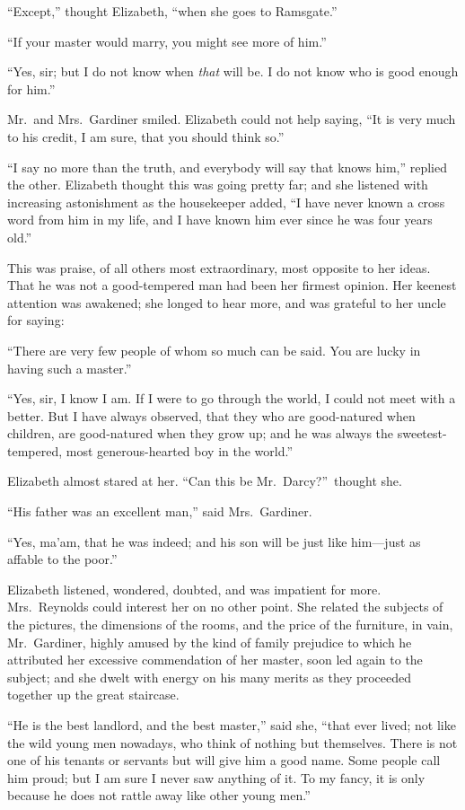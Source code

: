 \documentclass[12pt,english,oneside]{book}
\begin{document}
{}``Except,'' thought Elizabeth, {}``when she goes to Ramsgate.''

{}``If your master would marry, you might see more of him.''

{}``Yes, sir; but I do not know when \textit{that} will be. I do
not know who is good enough for him.''

Mr.\ and Mrs.\ Gardiner smiled. Elizabeth could not help saying,
{}``It is very much to his credit, I am sure, that you should think
so.''

{}``I say no more than the truth, and everybody will say that knows
him,'' replied the other. Elizabeth thought this was going pretty
far; and she listened with increasing astonishment as the housekeeper
added, {}``I have never known a cross word from him in my life, and
I have known him ever since he was four years old.''

This was praise, of all others most extraordinary, most opposite to
her ideas. That he was not a good-tempered man had been her firmest
opinion. Her keenest attention was awakened; she longed to hear more,
and was grateful to her uncle for saying:

{}``There are very few people of whom so much can be said. You are
lucky in having such a master.''

{}``Yes, sir, I know I am. If I were to go through the world, I could
not meet with a better. But I have always observed, that they who
are good-natured when children, are good-natured when they grow up;
and he was always the sweetest-tempered, most generous-hearted boy
in the world.''

Elizabeth almost stared at her. {}``Can this be Mr.\ Darcy?''\ thought
she.

{}``His father was an excellent man,'' said Mrs.\ Gardiner.

{}``Yes, ma'am, that he was indeed; and his son will be just like
him\mbox{---}just as affable to the poor.''

Elizabeth listened, wondered, doubted, and was impatient for more.
Mrs.\ Reynolds could interest her on no other point. She related
the subjects of the pictures, the dimensions of the rooms, and the
price of the furniture, in vain, Mr.\ Gardiner, highly amused by
the kind of family prejudice to which he attributed her excessive
commendation of her master, soon led again to the subject; and she
dwelt with energy on his many merits as they proceeded together up
the great staircase.

{}``He is the best landlord, and the best master,'' said she, {}``that
ever lived; not like the wild young men nowadays, who think of nothing
but themselves. There is not one of his tenants or servants but will
give him a good name. Some people call him proud; but I am sure I
never saw anything of it. To my fancy, it is only because he does
not rattle away like other young men.''
\end{document}

